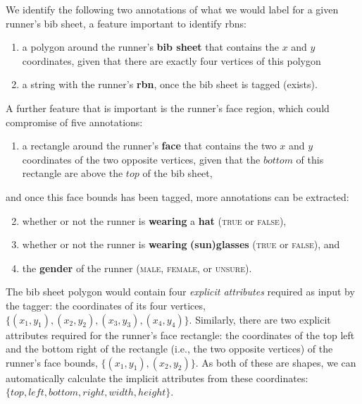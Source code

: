 We identify the following two annotations of what we would label for a given runner's bib sheet, a feature important to identify \glspl{rbn}:

\begin{enumerate}
  \item a polygon around the runner's \textbf{bib sheet} that contains the $x$ and $y$ coordinates, given that there are exactly four vertices of this polygon
  \item a string with the runner's \textbf{\gls{rbn}}, once the bib sheet is tagged (exists).
\end{enumerate}

A further feature that is important is the runner's face region, which could compromise of five annotations:

\begin{enumerate}
  \item a rectangle around the runner's \textbf{face} that contains the two $x$ and $y$ coordinates of the two opposite vertices, given that the $bottom$ of this rectangle are above the $top$ of the bib sheet,
\end{enumerate}

\noindent
and once this face bounds has been tagged, more annotations can be extracted:

\begin{enumerate}
  \setcounter{enumi}{1}
  \item whether or not the runner is \textbf{wearing} a \textbf{hat} (\textsc{true} or \textsc{false}),
  \item whether or not the runner is \textbf{wearing} \textbf{(sun)glasses} (\textsc{true} or \textsc{false}), and
  \item the \textbf{gender} of the runner (\textsc{male}, \textsc{female}, or \textsc{unsure}).
\end{enumerate}

The bib sheet polygon would contain four \textit{explicit attributes} required as input by the tagger: the coordinates of its four vertices, $\{ (x_{1}, y_{1}), (x_{2}, y_{2}), (x_{3}, y_{3}), (x_{4}, y_{4}) \}$. Similarly, there are two explicit attributes required for the runner's face rectangle: the coordinates of the top left and the bottom right of the rectangle (i.e., the two opposite vertices) of the runner's face bounds, $\{ (x_{1}, y_{1}), (x_{2}, y_{2}) \}$. As both of these are shapes, we can automatically calculate the implicit attributes from these coordinates:  $\{ top, left, bottom, right, width, height \}$.

